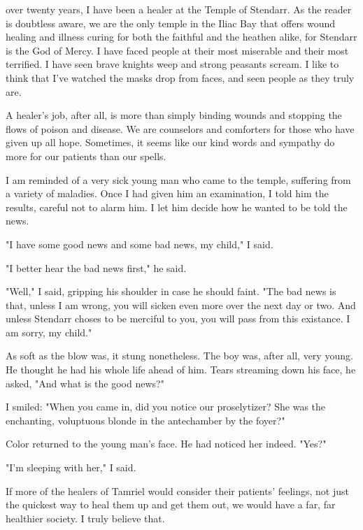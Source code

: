 
 over twenty years, I have been a healer at the Temple of Stendarr. As the reader is doubtless aware, we are the only temple in the Iliac Bay that offers wound healing and illness curing for both the faithful and the heathen alike, for Stendarr is the God of Mercy. I have faced people at their most miserable and their most terrified. I have seen brave knights weep and strong peasants scream. I like to think that I've watched the masks drop from faces, and seen people as they truly are.

A healer's job, after all, is more than simply binding wounds and stopping the flows of poison and disease. We are counselors and comforters for those who have given up all hope. Sometimes, it seems like our kind words and sympathy do more for our patients than our spells.

I am reminded of a very sick young man who came to the temple, suffering from a variety of maladies. Once I had given him an examination, I told him the results, careful not to alarm him. I let him decide how he wanted to be told the news.

"I have some good news and some bad news, my child," I said.

"I better hear the bad news first," he said.

"Well," I said, gripping his shoulder in case he should faint. "The bad news is that, unless I am wrong, you will sicken even more over the next day or two. And unless Stendarr choses to be merciful to you, you will pass from this existance. I am sorry, my child."

As soft as the blow was, it stung nonetheless. The boy was, after all, very young. He thought he had his whole life ahead of him. Tears streaming down his face, he asked, "And what is the good news?"

I smiled: "When you came in, did you notice our proselytizer? She was the enchanting, voluptuous blonde in the antechamber by the foyer?"

Color returned to the young man's face. He had noticed her indeed. "Yes?"

"I'm sleeping with her," I said.

If more of the healers of Tamriel would consider their patients' feelings, not just the quickest way to heal them up and get them out, we would have a far, far healthier society. I truly believe that.